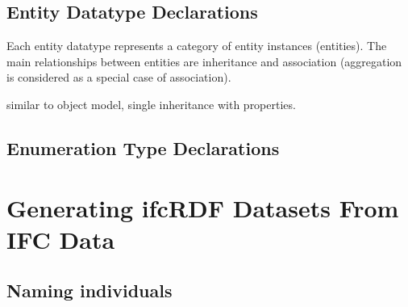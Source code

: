 \subsection{Entity Datatype Declarations}
\label{subsec:ifcOWL-entity-types}

Each entity data\-type represents a category of entity instances (entities). The main relationships between entities are inheritance and association (aggregation is considered as a special case of association).

similar to object model, single inheritance with properties.







\subsection{Enumeration Type Declarations}
\label{subsec:ifcOWL-enum-types}



\section{Generating ifcRDF Datasets From IFC Data}


\subsection{Naming individuals}
\label{ifcRDF:naming-individuals}